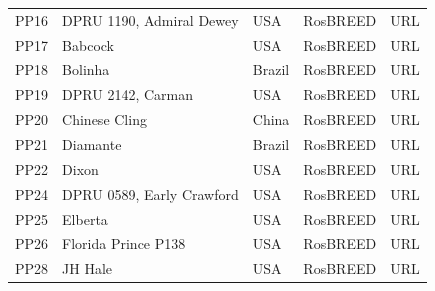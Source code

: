 \documentclass[12pt]{article}
\begin{document}
\begin{center}
\begin{longtable}{lllll}
                 PP16 &DPRU 1190, Admiral Dewey&USA &RosBREED &URL \\
                 PP17 &Babcock &USA &RosBREED &URL \\
                 PP18 &Bolinha &Brazil &RosBREED &URL \\
                 PP19 &DPRU 2142, Carman &USA &RosBREED &URL \\
                 PP20 &Chinese Cling&China &RosBREED &URL \\
                 PP21 &Diamante&Brazil &RosBREED &URL \\
                 PP22 &Dixon&USA &RosBREED &URL \\
                 PP24 &DPRU 0589, Early Crawford &USA &RosBREED &URL \\
                 PP25 &Elberta&USA &RosBREED &URL \\
                 PP26 &Florida Prince P138&USA &RosBREED &URL \\
                 PP28 &JH Hale&USA &RosBREED &URL \\

\end{longtable}
\end{center}
\end{document}
